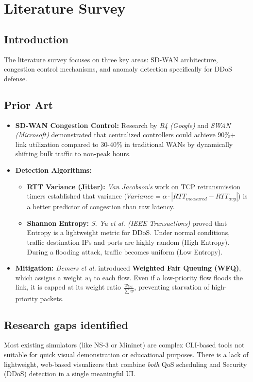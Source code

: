 \documentclass[12pt]{report}
\begin{document}
\chapter{Literature Survey}

\section{Introduction}
The literature survey focuses on three key areas: SD-WAN architecture, congestion control mechanisms, and anomaly detection specifically for DDoS defense.

\section{Prior Art}
\begin{itemize}
    \item \textbf{SD-WAN Congestion Control:} Research by \textit{B4 (Google)} and \textit{SWAN (Microsoft)} demonstrated that centralized controllers could achieve 90\%+ link utilization compared to 30-40\% in traditional WANs by dynamically shifting bulk traffic to non-peak hours.
    \item \textbf{Detection Algorithms:}
    \begin{itemize}
        \item \textbf{RTT Variance (Jitter):} \textit{Van Jacobson's} work on TCP retransmission timers established that variance ($Variance = \alpha \cdot |RTT_{measured} - RTT_{avg}|$) is a better predictor of congestion than raw latency.
        \item \textbf{Shannon Entropy:} \textit{S. Yu et al. (IEEE Transactions)} proved that Entropy is a lightweight metric for DDoS. Under normal conditions, traffic destination IPs and ports are highly random (High Entropy). During a flooding attack, traffic becomes uniform (Low Entropy).
    \end{itemize}
    \item \textbf{Mitigation:} \textit{Demers et al.} introduced \textbf{Weighted Fair Queuing (WFQ)}, which assigns a weight $w_i$ to each flow. Even if a low-priority flow floods the link, it is capped at its weight ratio $\frac{w_{low}}{\sum w}$, preventing starvation of high-priority packets.
\end{itemize}

\section{Research gaps identified}
Most existing simulators (like NS-3 or Mininet) are complex CLI-based tools not suitable for quick visual demonstration or educational purposes. There is a lack of lightweight, web-based visualizers that combine \textit{both} QoS scheduling and Security (DDoS) detection in a single meaningful UI.
\end{document}

